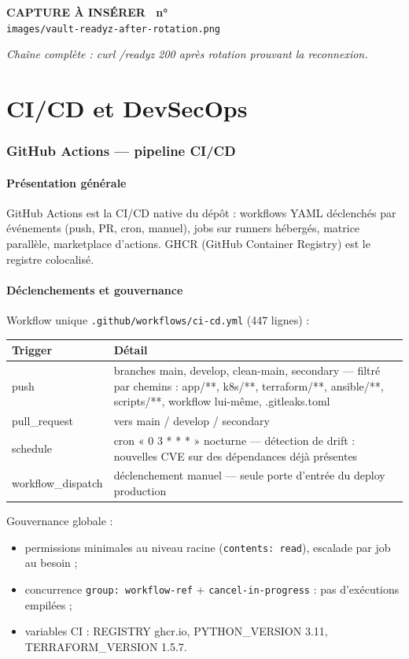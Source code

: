 \documentclass[12pt,a4paper]{article}
\newcounter{capturecount}
\newcommand{\capturebox}[2]{%
\par\vspace{4mm}
\begin{tcolorbox}[enhanced,colback=yellow!5,colframe=black!55,boxrule=0.7pt,
  borderline={0.7pt}{0pt}{black!40,dashed},
  arc=2mm,left=6pt,right=6pt,top=7pt,bottom=7pt]
\centering
{\normalsize\sffamily\bfseries CAPTURE À INSÉRER \textbar\ n°\,\stepcounter{capturecount}\thecapturecount}\\[3pt]
{\large\texttt{images/#2}}\\[7pt]
\begin{minipage}{0.94\linewidth}\centering\itshape #1\end{minipage}
\end{tcolorbox}
\par\vspace{2mm}}
\begin{document}
\capturebox{Chaîne complète : curl /readyz 200 après rotation prouvant la reconnexion.}{vault-readyz-after-rotation.png}

\clearpage
\part{CI/CD et DevSecOps}

\section{GitHub Actions --- pipeline CI/CD}

\subsection{Présentation générale}
GitHub Actions est la CI/CD native du dépôt : workflows YAML déclenchés par événements (push, PR, cron, manuel), jobs sur runners hébergés, matrice parallèle, marketplace d'actions. GHCR (GitHub Container Registry) est le registre colocalisé.

\subsection{Déclenchements et gouvernance}
Workflow unique \texttt{.github/workflows/ci-cd.yml} (447 lignes) :

\begin{longtable}{@{}p{3.4cm}p{10.8cm}@{}}
\toprule
\textbf{Trigger} & \textbf{Détail} \\
\midrule
\endhead
push & branches main, develop, clean-main, secondary --- filtré par chemins : app/**, k8s/**, terraform/**, ansible/**, scripts/**, workflow lui-même, .gitleaks.toml \\
pull\_request & vers main / develop / secondary \\
schedule & cron « 0 3 * * * » nocturne --- détection de drift : nouvelles CVE sur des dépendances déjà présentes \\
workflow\_dispatch & déclenchement manuel --- seule porte d'entrée du deploy production \\
\bottomrule
\end{longtable}

Gouvernance globale :
\begin{itemize}[itemsep=1pt]
  \item permissions minimales au niveau racine (\texttt{contents: read}), escalade par job au besoin ;
  \item concurrence \texttt{group: workflow-ref} + \texttt{cancel-in-progress} : pas d'exécutions empilées ;
  \item variables CI : REGISTRY ghcr.io, PYTHON\_VERSION 3.11, TERRAFORM\_VERSION 1.5.7.
\end{itemize}
\end{document}
